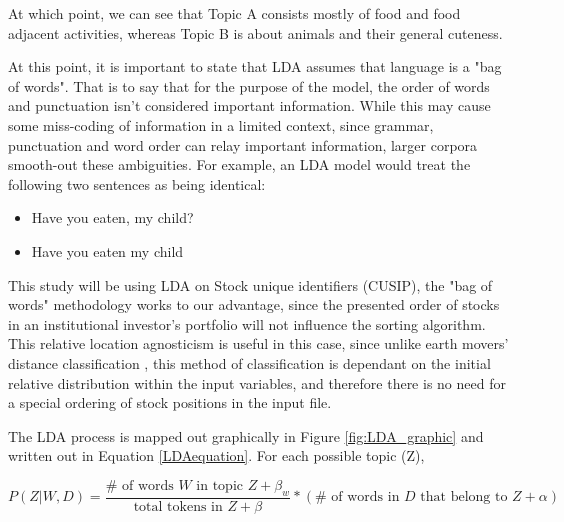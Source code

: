 At which point, we can see that Topic A consists mostly of food and food adjacent activities, whereas Topic B is about animals and their general cuteness. 

At this point, it is important to state that LDA assumes that language is a "bag of words". That is to say that for the purpose of the model, the order of words and punctuation isn't considered important information.  While this may cause some miss-coding of information in a limited context, since grammar, punctuation and word order can relay important information, larger corpora smooth-out these ambiguities. For example, an LDA model would treat the following two sentences as being identical:

\begin{itemize}	
	\item  Have you eaten, my child?
	
	\item  Have you eaten my child\textinterrobang 
\end{itemize}

This study will be using LDA on Stock unique identifiers (CUSIP), the "bag of words" methodology works to our advantage, since the presented order of stocks in an institutional investor's portfolio will not influence the sorting algorithm. This relative location agnosticism is useful in this case, since unlike earth movers' distance classification \citep{rubner2000earth}, this method of classification is dependant on the initial relative distribution within the input variables, and therefore there is no need for a special ordering of stock positions in the input file.  


The LDA process is mapped out graphically in Figure \ref{fig:LDA_graphic} and written out in Equation \ref{LDAequation}. For each possible topic (Z), 


\begin{equation}
P(Z|W,D) = \dfrac{\# \text{ of words } W \text{ in topic } Z + \beta_{w}}{\text{total tokens in } Z + \beta}*(\# \text{ of words in } D \text{ that belong to } Z + \alpha)
\label{LDAequation}
\end{equation}



